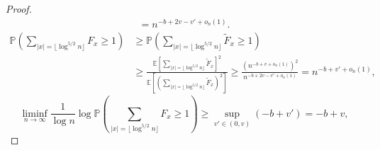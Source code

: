 \begin{proof}
\begin{align*}
        =
        n^{-b+2v-v'+o_n(1)}.
    \end{align*}
    \begin{align*}
        \mathbb P\left(
            \sum_{
                |x|=\lfloor\log^{5/2}n\rfloor
            }
            \!\!\!
            F_x
            \ge
            1
        \right)
        &
        \ge
        \mathbb P\left(
            \sum_{
                |x|=\lfloor\log^{5/2}n\rfloor
            }
            \!\!\!
            \widetilde F_x
            \ge
            1
        \right)
        \\ &
        \ge
        \frac{
            \mathbb E\!\left[
                \sum_{
                    |x|=\lfloor\log^{5/2}n\rfloor
                }
                \widetilde F_x
            \right]^2
        }{
            \mathbb E\!\left[
                \left(
                    \sum_{
                        |x|=\lfloor\log^{5/2}n\rfloor
                    }
                    \widetilde F_x
                \right)^2
            \right]
        }
        \ge
        \frac{
            (n^{-b+v+o_n(1)})^2
        }{
            n^{-b+2v-v'+o_n(1)}
        }
        =
        n^{-b+v'+o_n(1)}
        ,
    \end{align*}
    \begin{equation*}
        \liminf_{n\to\infty}
        \frac{1}{\log n}
        \log\mathbb P\left(
            \sum_{
                |x|=\lfloor\log^{5/2}n\rfloor
            }
            \!\!\!
            F_x
            \ge
            1
        \right)
        \ge
        \sup_{v'\in(0,v)}
        (-b+v')
        =
        -b+v
        ,
    \end{equation*}


\end{proof}
